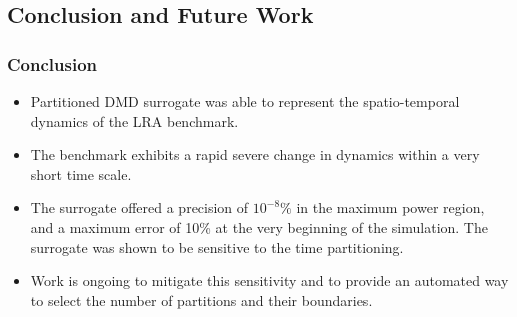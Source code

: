 \documentclass[fleqn]{beamer}
\begin{document}
   \begin{frame}
   \section{Conclusion and Future Work }
   \frametitle{Conclusion}
   \begin{itemize}
   \item Partitioned DMD surrogate was able to represent the spatio-temporal dynamics of the LRA benchmark.
   \item The benchmark exhibits a rapid severe change in dynamics within a very short time scale.
   \item The surrogate offered a precision of $10^{-8}\%$ in the maximum power region, and a maximum error of 10\% at the very beginning of the simulation. The surrogate was shown to be sensitive to the time partitioning. 
   \item Work is ongoing to mitigate this sensitivity and to provide an automated way to select the number of partitions and their boundaries.
   \end{itemize}
      \end{frame}
\end{document}
